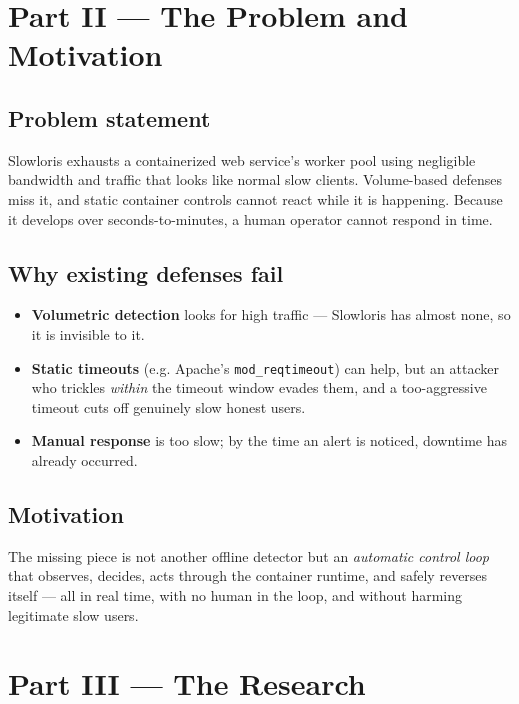 \documentclass[11pt,a4paper]{article}
\begin{document}
\section{Part II --- The Problem and Motivation}

\subsection{Problem statement}
Slowloris exhausts a containerized web service's worker pool using negligible
bandwidth and traffic that looks like normal slow clients. Volume-based defenses
miss it, and static container controls cannot react while it is happening. Because
it develops over seconds-to-minutes, a human operator cannot respond in time.

\subsection{Why existing defenses fail}
\begin{itemize}
  \item \textbf{Volumetric detection} looks for high traffic --- Slowloris has
  almost none, so it is invisible to it.
  \item \textbf{Static timeouts} (e.g. Apache's \texttt{mod\_reqtimeout}) can help,
  but an attacker who trickles \emph{within} the timeout window evades them, and a
  too-aggressive timeout cuts off genuinely slow honest users.
  \item \textbf{Manual response} is too slow; by the time an alert is noticed,
  downtime has already occurred.
\end{itemize}

\subsection{Motivation}
The missing piece is not another offline detector but an \emph{automatic control
loop} that observes, decides, acts through the container runtime, and safely
reverses itself --- all in real time, with no human in the loop, and without
harming legitimate slow users.

\section{Part III --- The Research}
\end{document}
